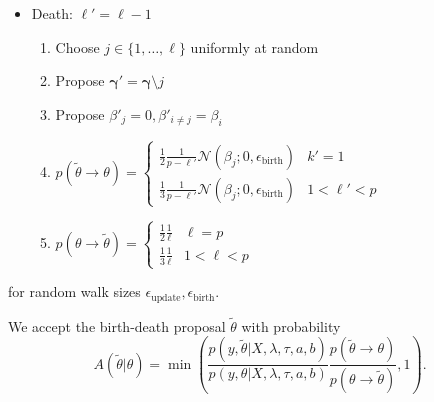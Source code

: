 \begin{itemize}
    \item Death: $\ell' = \ell-1$
    \begin{enumerate}
        \item Choose $j \in \{1, \ldots, \ell\}$ uniformly at random
        \item Propose $\mathbf{\gamma}' = \mathbf{\gamma} \setminus j$ 
        \item Propose $\beta'_{j} = 0, \beta'_{i \neq j} = \beta_{i}$
        \item $p(\tilde{\theta} \rightarrow \theta) = \begin{cases}\frac{1}{2}\frac{1}{p-\ell'} \mathcal{N}(\beta_{j}; 0,\epsilon_{\text{birth}}) & k'=1 \\ \frac{1}{3} \frac{1}{p-\ell'} \mathcal{N}(\beta_{j}; 0,\epsilon_{\text{birth}}) & 1<\ell'<p \end{cases} $
        \item $p(\theta \rightarrow \tilde{\theta}) = \begin{cases}\frac{1}{2}\frac{1}{\ell} & \ell=p \\ \frac{1}{3} \frac{1}{\ell} & 1<\ell<p \end{cases} $
    \end{enumerate}
\end{itemize}
for random walk sizes $\epsilon_{\text{update}}, \epsilon_{\text{birth}}$.

We accept the birth-death proposal $\tilde{\theta}$ with probability 
\begin{equation}
    A(\tilde{\theta}|\theta) = \min{\left(\frac{p(y, \tilde{\theta} |  X,  \lambda, \tau, a, b  )}{p(y, \theta |  X, \lambda, \tau, a, b  )} \frac{p(\tilde{\theta} \rightarrow \theta)}{p(\theta \rightarrow \tilde{\theta})}, 1\right)}.
\end{equation}

